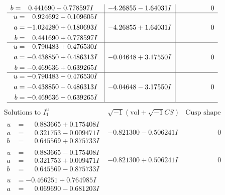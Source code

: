 \documentclass[1p]{elsarticle_modified}
\theoremstyle{definition}
\newcommand{\I}{\sqrt{-1}}
\begin{document}
$$\begin{array}{c|c|c}
\begin{aligned}
b &= \phantom{-}0.441690 - 0.778597 I\end{aligned}
 & -4.26855 - 1.64031 I & \phantom{-0.000000 } 0 \\ \hline\begin{aligned}
u &= \phantom{-}0.924692 - 0.109605 I \\
a &= -1.024280 + 0.180693 I \\
b &= \phantom{-}0.441690 + 0.778597 I\end{aligned}
 & -4.26855 + 1.64031 I & \phantom{-0.000000 } 0 \\ \hline\begin{aligned}
u &= -0.790483 + 0.476530 I \\
a &= -0.438850 + 0.486313 I \\
b &= -0.469636 + 0.639265 I\end{aligned}
 & -0.04648 + 3.17550 I & \phantom{-0.000000 } 0 \\ \hline\begin{aligned}
u &= -0.790483 - 0.476530 I \\
a &= -0.438850 - 0.486313 I \\
b &= -0.469636 - 0.639265 I\end{aligned}
 & -0.04648 - 3.17550 I & \phantom{-0.000000 } 0\\
 \hline 
 \end{array}$$\newpage$$\begin{array}{c|c|c}  
\text{Solutions to }I^u_{1}& \I (\text{vol} + \sqrt{-1}CS) & \text{Cusp shape}\\
 \hline 
\begin{aligned}
u &= \phantom{-}0.883665 + 0.175408 I \\
a &= \phantom{-}0.321753 - 0.009471 I \\
b &= \phantom{-}0.645569 + 0.875733 I\end{aligned}
 & -0.821300 - 0.506241 I & \phantom{-0.000000 } 0 \\ \hline\begin{aligned}
u &= \phantom{-}0.883665 - 0.175408 I \\
a &= \phantom{-}0.321753 + 0.009471 I \\
b &= \phantom{-}0.645569 - 0.875733 I\end{aligned}
 & -0.821300 + 0.506241 I & \phantom{-0.000000 } 0 \\ \hline\begin{aligned}
u &= -0.466251 + 0.764985 I \\
a &= \phantom{-}0.069690 - 0.681203 I \\

\end{aligned}
\end{array}$$
\end{document}
